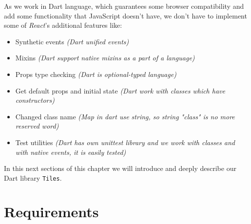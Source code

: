 \documentclass[oneside, 12pt]{book}
\begin{document}
As we work in Dart language, which guarantees some browser compatibility and add some functionality that JavaScript doesn't have,
we don't have to implement some of \textit{React}'s additional features like:
\begin{itemize}
  \item Synthetic events \textit{(Dart unified events)}
  \item Mixins \textit{(Dart support native mixins as a part of a language)}
  \item Props type checking \textit{(Dart is optional-typed language)}
  \item Get default props and initial state \textit{(Dart work with classes which have constructors)}
  \item Changed class name \textit{(Map in dart use string, so string "class" is no more reserved word)}
  \item Test utilities \textit{(Dart has own unittest library and we work with classes and with native events, it is easily tested)}
\end{itemize}

In this next sections of this chapter we will introduce and deeply describe our Dart library \texttt{Tiles}.

\section{Requirements}\label{subsec:our-architecture-requirements}
\end{document}

